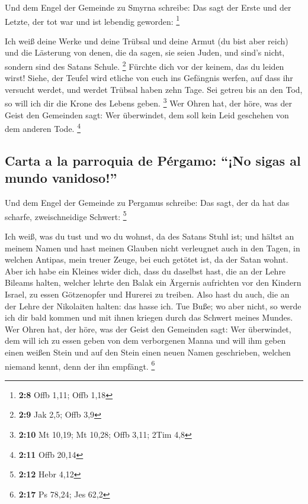  Und dem Engel der Gemeinde zu Smyrna schreibe: Das sagt
der Erste und der Letzte, der tot war und ist lebendig geworden:
\footnote{\textbf{2:8} Offb 1,11; Offb 1,18}

 Ich weiß deine Werke und deine Trübsal und deine Armut
(du bist aber reich) und die Lästerung von denen, die da sagen, sie
seien Juden, und sind's nicht, sondern sind des Satans Schule.
\footnote{\textbf{2:9} Jak 2,5; Offb 3,9}  Fürchte dich
vor der keinem, das du leiden wirst! Siehe, der Teufel wird etliche von
euch ins Gefängnis werfen, auf dass ihr versucht werdet, und werdet
Trübsal haben zehn Tage. Sei getreu bis an den Tod, so will ich dir die
Krone des Lebens geben. \footnote{\textbf{2:10} Mt 10,19; Mt 10,28; Offb
  3,11; 2Tim 4,8}  Wer Ohren hat, der höre, was der Geist
den Gemeinden sagt: Wer überwindet, dem soll kein Leid geschehen von dem
anderen Tode. \footnote{\textbf{2:11} Offb 20,14}

\hypertarget{carta-a-la-parroquia-de-puxe9rgamo-no-sigas-al-mundo-vanidoso}{%
\subsection{Carta a la parroquia de Pérgamo: ``¡No sigas al mundo
vanidoso!''}\label{carta-a-la-parroquia-de-puxe9rgamo-no-sigas-al-mundo-vanidoso}}

 Und dem Engel der Gemeinde zu Pergamus schreibe: Das
sagt, der da hat das scharfe, zweischneidige Schwert: \footnote{\textbf{2:12}
  Hebr 4,12}

 Ich weiß, was du tust und wo du wohnst, da des Satans
Stuhl ist; und hältst an meinem Namen und hast meinen Glauben nicht
verleugnet auch in den Tagen, in welchen Antipas, mein treuer Zeuge, bei
euch getötet ist, da der Satan wohnt.  Aber ich habe ein
Kleines wider dich, dass du daselbst hast, die an der Lehre Bileams
halten, welcher lehrte den Balak ein Ärgernis aufrichten vor den Kindern
Israel, zu essen Götzenopfer und Hurerei zu treiben. 
Also hast du auch, die an der Lehre der Nikolaiten halten: das hasse
ich.  Tue Buße; wo aber nicht, so werde ich dir bald
kommen und mit ihnen kriegen durch das Schwert meines Mundes.
 Wer Ohren hat, der höre, was der Geist den Gemeinden
sagt: Wer überwindet, dem will ich zu essen geben von dem verborgenen
Manna und will ihm geben einen weißen Stein und auf den Stein einen
neuen Namen geschrieben, welchen niemand kennt, denn der ihn empfängt.
\footnote{\textbf{2:17} Ps 78,24; Jes 62,2}

